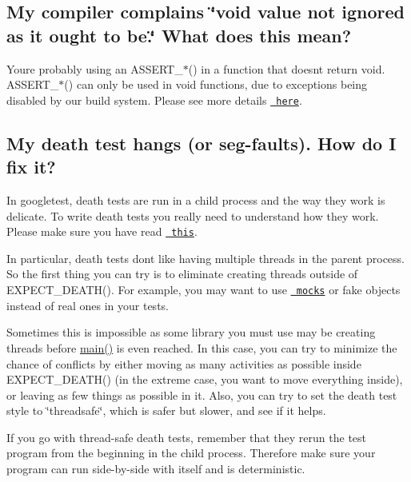 \subsection*{My compiler complains \char`\"{}void value not ignored as it ought to be.\char`\"{} What does this mean?}

You\textquotesingle{}re probably using an {\ttfamily A\+S\+S\+E\+R\+T\+\_\+$\ast$()} in a function that doesn\textquotesingle{}t return {\ttfamily void}. {\ttfamily A\+S\+S\+E\+R\+T\+\_\+$\ast$()} can only be used in {\ttfamily void} functions, due to exceptions being disabled by our build system. Please see more details \href{advanced.md\#assertion-placement}{\texttt{ here}}.

\subsection*{My death test hangs (or seg-\/faults). How do I fix it?}

In googletest, death tests are run in a child process and the way they work is delicate. To write death tests you really need to understand how they work. Please make sure you have read \href{advanced.md\#how-it-works}{\texttt{ this}}.

In particular, death tests don\textquotesingle{}t like having multiple threads in the parent process. So the first thing you can try is to eliminate creating threads outside of {\ttfamily E\+X\+P\+E\+C\+T\+\_\+\+D\+E\+A\+T\+H()}. For example, you may want to use \href{../../googlemock}{\texttt{ mocks}} or fake objects instead of real ones in your tests.

Sometimes this is impossible as some library you must use may be creating threads before {\ttfamily \mbox{\hyperlink{_be_01vektoriaus_2main_8cpp_ae66f6b31b5ad750f1fe042a706a4e3d4}{main()}}} is even reached. In this case, you can try to minimize the chance of conflicts by either moving as many activities as possible inside {\ttfamily E\+X\+P\+E\+C\+T\+\_\+\+D\+E\+A\+T\+H()} (in the extreme case, you want to move everything inside), or leaving as few things as possible in it. Also, you can try to set the death test style to {\ttfamily \char`\"{}threadsafe\char`\"{}}, which is safer but slower, and see if it helps.

If you go with thread-\/safe death tests, remember that they rerun the test program from the beginning in the child process. Therefore make sure your program can run side-\/by-\/side with itself and is deterministic.

